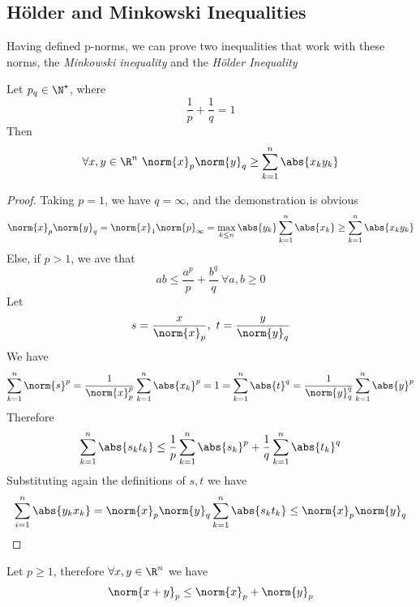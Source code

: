 \documentclass[../mmf.tex]{subfiles}
\begin{document}
\subsection{Hölder and Minkowski Inequalities}
Having defined p-norms, we can prove two inequalities that work with these norms, the \textit{Minkowski inequality} and the \textit{Hölder Inequality}
\begin{thm}
	Let $p_q\in\N^\star$, where
	\begin{equation*}
		\frac{1}{p}+\frac{1}{q}=1
	\end{equation*}
	Then
	\begin{equation}
		\forall x,y\in\R^n\ \norm{x}_p\norm{y}_q\ge\sum_{k=1}^n\abs{x_ky_k}
		\label{eq:holderineq}
	\end{equation}
\end{thm}
\begin{proof}
	Taking $p=1$, we have $q=\infty$, and the demonstration is obvious
	\begin{equation*}
		\norm{x}_p\norm{y}_q=\norm{x}_1\norm{p}_\infty=\max_{k\le n}\abs{y_k}\sum_{k=1}^n\abs{x_k}\ge\sum_{k=1}^n\abs{x_ky_k}
	\end{equation*}
	Else, if $p>1$, we ave that
	\begin{equation*}
		ab\le\frac{a^p}{p}+\frac{b^q}{q}\ \forall a,b\ge0
	\end{equation*}
	Let
	\begin{equation*}
		s=\frac{x}{\norm{x}_p},\ t=\frac{y}{\norm{y}_q}
	\end{equation*}
	We have
	\begin{equation*}
		\sum_{k=1}^n\norm{s}^p=\frac{1}{\norm{x}_p^p}\sum_{k=1}^n\abs{x_k}^p=1=\sum_{k=1}^n\abs{t}^q=\frac{1}{\norm{y}_q^q}\sum_{k=1}^n\abs{y}^p
	\end{equation*}
	Therefore
	\begin{equation*}
		\sum_{k=1}^n\abs{s_kt_k}\le\frac{1}{p}\sum_{k=1}^n\abs{s_k}^p+\frac{1}{q}\sum_{k=1}^n\abs{t_k}^q
	\end{equation*}
	Substituting again the definitions of $s,t$ we have
	\begin{equation*}
		\sum_{i=1}^n\abs{y_kx_k}=\norm{x}_p\norm{y}_q\sum_{k=1}^n\abs{s_kt_k}\le\norm{x}_p\norm{y}_q
	\end{equation*}
\end{proof}
\begin{thm}
	Let $p\ge1$, therefore $\forall x,y\in\R^n$ we have
	\begin{equation}
		\norm{x+y}_p\le\norm{x}_p+\norm{y}_p
		\label{eq:minkowskiineq}
	\end{equation}
\end{thm}
\end{document}
